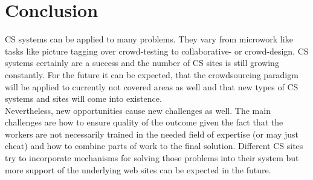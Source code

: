 \documentclass{acm_proc_article-sp}
\begin{document}
\section{Conclusion}
\label{sect:conclusion}
CS systems can be applied to many problems. They vary from microwork like tasks like picture tagging over crowd-testing to collaborative- or crowd-design. CS systems certainly are a success and the number of CS sites is still growing constantly. For the future it can be expected, that the crowdsourcing paradigm will be applied to currently not covered areas as well and that new types of CS systems and sites will come into existence.\\
Nevertheless, new opportunities cause new challenges as well. The main challenges are how to ensure quality of the outcome given the fact that the workers are not necessarily trained in the needed field of expertise (or may just cheat) and how to combine parts of work to the final solution. Different CS sites try to incorporate mechanisms for solving those problems into their system but more support of the underlying web sites can be expected in the future.

%

%
%

\balancecolumns
\end{document}
